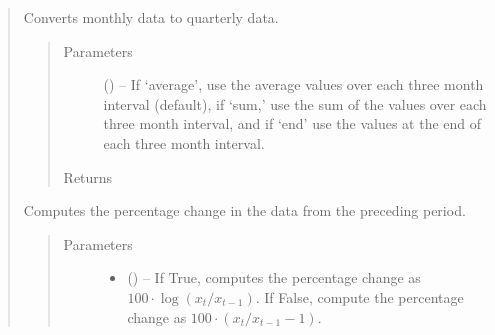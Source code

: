 \documentclass[letterpaper,10pt,openany,oneside,english]{sphinxmanual}
\begin{document}
\begin{fulllineitems}
\begin{quote}
\begin{fulllineitems}
\begin{quote}
\begin{description}
\end{description}\end{quote}

\end{fulllineitems}


\begin{fulllineitems}
\label{\detokenize{series_class:fredpy.series.monthtoquarter}}
Converts monthly data to quarterly data.
\begin{quote}\begin{description}
\item[{Parameters}] \leavevmode
{} (\href{https://docs.python.org/2/library/string.html\#module-string}{}) -- If `average', use the average values over each three month interval (default), if `sum,' use the sum of the values over each three month interval, and if `end' use the values at the end of each three month interval.

\item[{Returns}] \leavevmode
{\hyperref[\detokenize{series_class:fredpy.series}]{}}

\end{description}\end{quote}

\end{fulllineitems}


\begin{fulllineitems}
\label{\detokenize{series_class:fredpy.series.pc}}
Computes the percentage change in the data from the preceding period.
\begin{quote}\begin{description}
\item[{Parameters}] \leavevmode\begin{itemize}
\item {} 
 (\href{https://docs.python.org/2/library/functions.html\#bool}{}) -- If True, computes the percentage change as \(100\cdot\log(x_{t}/x_{t-1})\). If False, compute the percentage change as \(100\cdot\left( x_{t}/x_{t-1} - 1\right)\).


\end{itemize}
\end{description}
\end{quote}
\end{fulllineitems}
\end{quote}
\end{fulllineitems}
\end{document}
